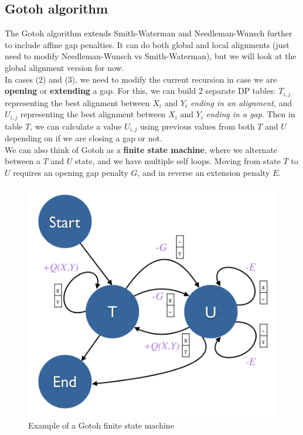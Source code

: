 \documentclass[12pt]{article}
\begin{document}
\subsection{Gotoh algorithm}
The Gotoh algorithm extends Smith-Waterman and Needleman-Wunsch further to include affine gap penalties. It can do both global and local alignments (just need to modify Needleman-Wunsch vs Smith-Waterman), but we will look at the global alignment version for now.\\[10pt]
In cases (2) and (3), we need to modify the current recursion in case we are \textbf{opening} or \textbf{extending} a gap. For this, we can build 2 separate DP tables: $T_{i,j}$ representing the best alignment between $X_i$ and $Y_i$ \textit{ending in an alignment}, and $U_{i,j}$ representing the best alignment between $X_i$ and $Y_i$ \textit{ending in a gap}. Then in table $T$, we can calculate a value $U_{i,j}$ using previous values from both $T$ and $U$ depending on if we are closing a gap or not.\\[10pt]
We can also think of Gotoh as a \textbf{finite state machine}, where we alternate between a $T$ and $U$ state, and we have multiple self loops. Moving from state $T$ to $U$ requires an opening gap penalty $G$, and in reverse an extension penalty $E$.
\begin{figure}[h]
    \centering
    \includegraphics[width=.6\linewidth]{gotoh_state.png}
    \caption{Example of a Gotoh finite state machine}
    \label{fig:gotoh}
\end{figure}
\end{document}
